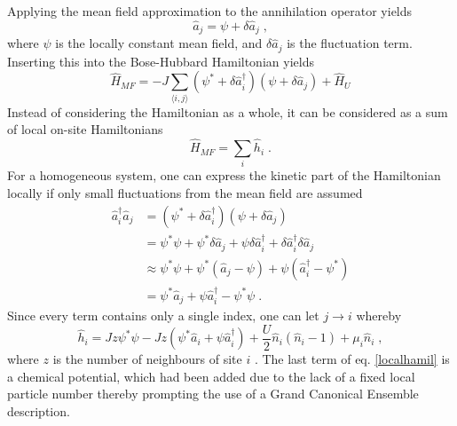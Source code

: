 Applying the mean field approximation to the annihilation operator yields
\begin{equation}
	\hat{a}_j = \psi + \delta \hat{a}_j \; ,
\end{equation}
where $\psi$ is the locally constant mean field, and $\delta \hat{a}_j$ is the fluctuation term. Inserting this into the Bose-Hubbard Hamiltonian yields
\begin{equation}
	\hat{H}_{MF} = -J \sum_{\langle i,j \rangle} \left( \psi^* + \delta \hat{a}_{i}^{\dag} \right) \left( \psi + \delta \hat{a}_{j} \right) + \hat{H}_U
\end{equation}
Instead of considering the Hamiltonian as a whole, it can be considered as a sum of local on-site Hamiltonians
\begin{equation}
	\hat{H}_{MF} = \sum_{i} \hat{h}_i \; .
\end{equation}
For a homogeneous system, one can express the kinetic part of the Hamiltonian locally if only small fluctuations from the mean field are assumed
\begin{align}
  \hat{a}_{i}^{\dag} \hat{a}_{j} &= \left( \psi^* + \delta \hat{a}_{i}^{\dag} \right) \left( \psi + \delta \hat{a}_{j} \right) \nonumber \\
  &= \psi^* \psi + \psi^* \delta \hat{a}_j + \psi \delta \hat{a}_{i}^{\dag} + \delta \hat{a}_{i}^{\dag} \delta \hat{a}_{j} \nonumber \\
  & \approx \psi^* \psi + \psi^* \left( \hat{a}_j - \psi \right) + \psi \left( \hat{a}_{i}^{\dag} - \psi^* \right) \nonumber \\
&= \psi^* \hat{a}_j + \psi \hat{a}_{i}^{\dag} - \psi^* \psi \; .
\end{align}
Since every term contains only a single index, one can let $j \rightarrow i$ whereby
\begin{equation}
	\hat{h}_i = J z \psi^* \psi - J z \left( \psi^* \hat{a}_i + \psi \hat{a}_{i}^{\dag} \right) + \frac{U}{2} \hat{n}_i \left( \hat{n}_i -1 \right) + \mu_i \hat{n}_i \; ,
	\label{localhamil}
\end{equation}
where $z$ is the number of neighbours of site $i$ \cite{vanoosten}. The last term of eq. \eqref{localhamil} is a chemical potential, which had been added due to the lack of a fixed local particle number thereby prompting the use of a Grand Canonical Ensemble description.

